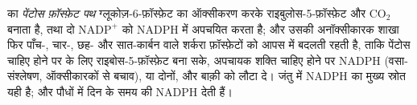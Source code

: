 \begin{definition}[पेंटोस फ़ॉस्फ़ेट पथ]\label{def:b1:biosyntheses-integration:ppp}
 का \emph{पेंटोस फ़ॉस्फ़ेट पथ}
ग्लूकोज़-6-फ़ॉस्फ़ेट का ऑक्सीकरण करके राइबुलोस-5-फ़ॉस्फ़ेट और
$\mathrm{CO_2}$ बनाता है, तथा दो $\mathrm{NADP^+}$ को NADPH में अपचयित
करता है; और उसकी अनॉक्सीकारक शाखा फिर पाँच-, चार-, छह- और सात-कार्बन वाले
शर्करा फ़ॉस्फ़ेटों को आपस में बदलती रहती है, ताकि  पेंटोस चाहिए
होने पर  के लिए राइबोस-5-फ़ॉस्फ़ेट बना सके, अपचायक शक्ति
चाहिए होने पर NADPH (वसा-संश्लेषण, ऑक्सीकारकों से बचाव), या दोनों, और
बाक़ी  को लौटा दे। जंतु  में NADPH का मुख्य स्रोत
यही है; और पौधों में दिन के समय  की  NADPH देती
हैं।
\end{definition}

